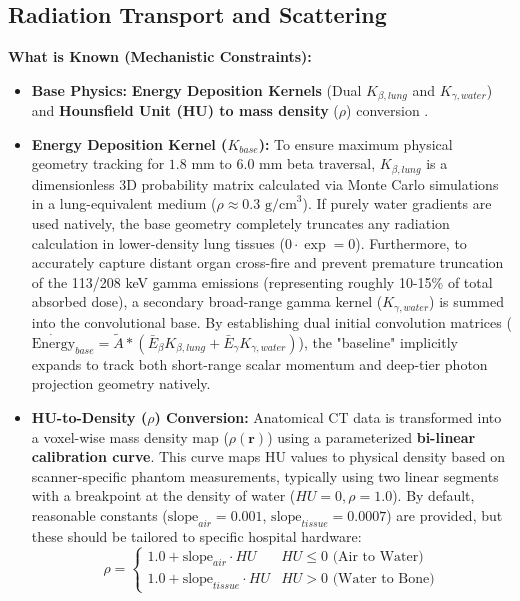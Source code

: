 \documentclass[11pt,a4paper]{article}
\begin{document}
\subsection{Radiation Transport and Scattering}
\textbf{What is Known (Mechanistic Constraints):}
\begin{itemize}
    \item \textbf{Base Physics:} \textbf{Energy Deposition Kernels} (Dual $K_{\beta, lung}$ and $K_{\gamma, water}$) and \textbf{Hounsfield Unit (HU) to mass density} ($\rho$) conversion \cite{GtzSchmidkonz2019}.
    \item \textbf{Energy Deposition Kernel ($K_{base}$):} To ensure maximum physical geometry tracking for $1.8 \text{ mm}$ to $6.0 \text{ mm}$ beta traversal, $K_{\beta, lung}$ is a dimensionless 3D probability matrix calculated via Monte Carlo simulations in a lung-equivalent medium ($\rho \approx 0.3 \text{ g/cm}^3$). If purely water gradients are used natively, the base geometry completely truncates any radiation calculation in lower-density lung tissues ($0 \cdot \exp = 0$). Furthermore, to accurately capture distant organ cross-fire and prevent premature truncation of the 113/208 keV gamma emissions (representing roughly 10-15\% of total absorbed dose), a secondary broad-range gamma kernel ($K_{\gamma, water}$) is summed into the convolutional base. By establishing dual initial convolution matrices ($\dot{\text{Energy}}_{base} = \tilde{A} \ast (\bar{E}_{\beta} K_{\beta, lung} + \bar{E}_{\gamma} K_{\gamma, water})$), the "baseline" implicitly expands to track both short-range scalar momentum and deep-tier photon projection geometry natively.
    \item \textbf{HU-to-Density ($\rho$) Conversion:} Anatomical CT data is transformed into a voxel-wise mass density map ($\rho(\mathbf{r})$) using a parameterized \textbf{bi-linear calibration curve}. This curve maps HU values to physical density based on scanner-specific phantom measurements, typically using two linear segments with a breakpoint at the density of water ($HU=0, \rho=1.0$). By default, reasonable constants ($\text{slope}_{air} = 0.001$, $\text{slope}_{tissue} = 0.0007$) are provided, but these should be tailored to specific hospital hardware:
    \begin{equation}
        \rho = \begin{cases} 1.0 + \text{slope}_{air} \cdot HU & HU \leq 0 \text{ (Air to Water)} \\ 1.0 + \text{slope}_{tissue} \cdot HU & HU > 0 \text{ (Water to Bone)} \end{cases}

\end{equation}
\end{itemize}
\end{document}

